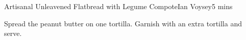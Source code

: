 \begin{recipe}{Artisanal Unleavened Flatbread with Legume Compote}{Ian Voysey}{5 mins}

  Spread the peanut butter on one tortilla. Garnish with an extra tortilla
  and serve.
\end{recipe}
